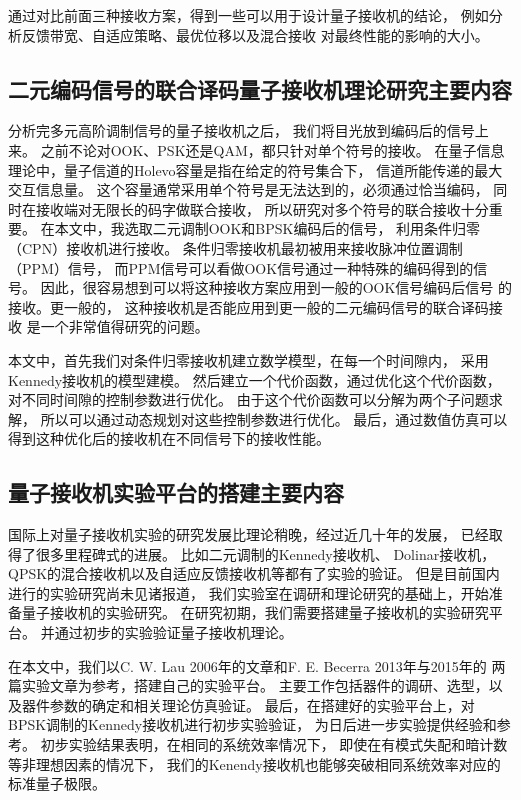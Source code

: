 通过对比前面三种接收方案，得到一些可以用于设计量子接收机的结论，
例如分析反馈带宽、自适应策略、最优位移以及混合接收
对最终性能的影响的大小。

\subsection{二元编码信号的联合译码量子接收机理论研究主要内容}

分析完多元高阶调制信号的量子接收机之后，
我们将目光放到编码后的信号上来。
之前不论对OOK、PSK还是QAM，都只针对单个符号的接收。
在量子信息理论中，量子信道的Holevo容量是指在给定的符号集合下，
信道所能传递的最大交互信息量。
这个容量通常采用单个符号是无法达到的，必须通过恰当编码，
同时在接收端对无限长的码字做联合接收，
所以研究对多个符号的联合接收十分重要\cite{holevo1996capacity,hausladen1996classical}。
在本文中，我选取二元调制OOK和BPSK编码后的信号，
利用条件归零（CPN）接收机进行接收。
条件归零接收机最初被用来接收脉冲位置调制（PPM）信号\cite{dolinar1982near}，
而PPM信号可以看做OOK信号通过一种特殊的编码得到的信号。
因此，很容易想到可以将这种接收方案应用到一般的OOK信号编码后信号
的接收。更一般的，
这种接收机是否能应用到更一般的二元编码信号的联合译码接收
是一个非常值得研究的问题。

本文中，首先我们对条件归零接收机建立数学模型，在每一个时间隙内，
采用Kennedy接收机的模型建模。
然后建立一个代价函数，通过优化这个代价函数，
对不同时间隙的控制参数进行优化。
由于这个代价函数可以分解为两个子问题求解，
所以可以通过动态规划对这些控制参数进行优化。
最后，通过数值仿真可以得到这种优化后的接收机在不同信号下的接收性能。

\subsection{量子接收机实验平台的搭建主要内容}
国际上对量子接收机实验的研究发展比理论稍晚，经过近几十年的发展，
已经取得了很多里程碑式的进展。
比如二元调制的Kennedy接收机\cite{lau2006binary}、
Dolinar接收机\cite{lau2006binary,cook2007optical}，
QPSK的混合接收机以及自适应反馈接收机等都有了实验的验证\cite{muller2012quadrature,becerra2013experimental}。
但是目前国内进行的实验研究尚未见诸报道，
我们实验室在调研和理论研究的基础上，开始准备量子接收机的实验研究。
在研究初期，我们需要搭建量子接收机的实验研究平台。
并通过初步的实验验证量子接收机理论。

在本文中，我们以C. W. Lau 2006年的文章和F. E. Becerra 2013年与2015年的
两篇实验文章为参考\cite{lau2006binary,becerra2013experimental,becerra2015photon}，搭建自己的实验平台。
主要工作包括器件的调研、选型，以及器件参数的确定和相关理论仿真验证。
最后，在搭建好的实验平台上，对BPSK调制的Kennedy接收机进行初步实验验证，
为日后进一步实验提供经验和参考。
初步实验结果表明，在相同的系统效率情况下，
即使在有模式失配和暗计数等非理想因素的情况下，
我们的Kenendy接收机也能够突破相同系统效率对应的标准量子极限。

 

